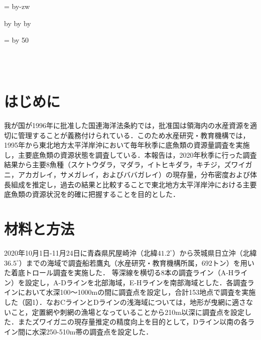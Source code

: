 \documentclass[11pt]{article} %
\makeatletter
\def\mojiparline#1{
\newcounter{mpl}
\setcounter{mpl}{#1}
\@tempdima=\linewidth
\advance\@tempdima by-\value{mpl}zw
\addtocounter{mpl}{-1}
\divide\@tempdima by \value{mpl}
\advance\kanjiskip by\@tempdima
\advance\parindent by\@tempdima
}
\def\linesparpage#1{
\baselineskip=\textheight
\divide\baselineskip by #1
}
\makeatother
\begin{document}

\mojiparline{40} %
\linesparpage{50} %

\begin{linenumbers}
\\
\\


\section{はじめに}
我が国が1996年に批准した国連海洋法条約では，批准国は領海内の水産資源を適切に管理することが義務付けられている．このため水産研究・教育機構では，1995年から東北地方太平洋岸沖において毎年秋季に底魚類の資源量調査を実施し，主要底魚類の資源状態を調査している．本報告は，2020年秋季に行った調査結果から主要8魚種（スケトウダラ，マダラ，イトヒキダラ，キチジ，ズワイガニ，アカガレイ，サメガレイ，およびババガレイ）の現存量，分布密度および体長組成を推定し，過去の結果と比較することで東北地方太平洋岸沖における主要底魚類の資源状況を的確に把握することを目的とした．

\section{材料と方法}
2020年10月1日-11月24日に青森県尻屋崎沖（北緯$\textrm{41.2}^\circ$）から茨城県日立沖（北緯$\textrm{36.5}^\circ$）までの海域で調査船若鷹丸（水産研究・教育機構所属，692トン）を用いた着底トロール調査を実施した．
等深線を横切る8本の調査ライン（A-Hライン）を設定し，A-Dラインを北部海域，E-Hラインを南部海域とした．各調査ラインにおいて水深100～1000mの間に調査点を設定し，合計153地点で調査を実施した（図1）．なおCラインとDラインの浅海域については，地形が曳網に適さないこと，定置網や刺網の漁場となっていることから210m以深に調査点を設定した．またズワイガニの現存量推定の精度向上を目的として，Dライン以南の各ライン間に水深250-510m帯の調査点を設定した．


\end{linenumbers}
\end{document}
